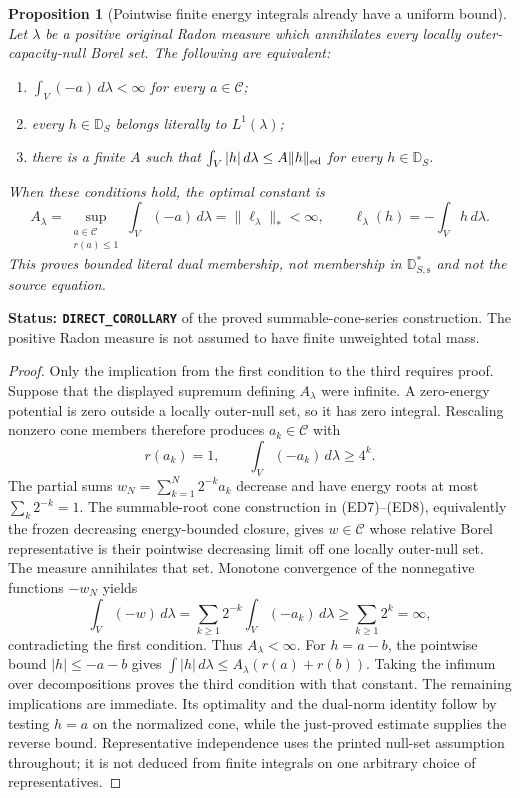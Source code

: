 \documentclass[11pt,a4paper]{article}
\numberwithin{equation}{section}
\newtheorem{proposition}[theorem]{Proposition}
\theoremstyle{definition}
\theoremstyle{remark}
\begin{document}
\begin{proposition}[Pointwise finite energy integrals already have a uniform bound]
\label{prop:r12-pointwise-finite-literal-dual}
Let $\lambda$ be a positive original Radon measure which
annihilates every locally outer-capacity-null Borel set. The
following are equivalent:
\begin{enumerate}
\item $\int_V(-a)\,d\lambda<\infty$ for every $a\in\mathscr C$;
\item every $h\in\mathbb D_S$ belongs literally to $L^1(\lambda)$;
\item there is a finite $A$ such that
$\int_V|h|\,d\lambda\leq A\|h\|_{\rm ed}$ for every
$h\in\mathbb D_S$.
\end{enumerate}
When these conditions hold, the optimal constant is
\[
 A_\lambda
   =\sup_{\substack{a\in\mathscr C\\r(a)\leq1}}
                  \int_V(-a)\,d\lambda
   =\|\ell_\lambda\|_*<\infty,
 \qquad \ell_\lambda(h)=-\int_Vh\,d\lambda.
 \tag{FD13}
\]
This proves bounded literal dual membership, not membership
in $\mathbb D_{S,\mathrm s}^*$ and not the source equation.
\end{proposition}

\noindent\textbf{Status: \texttt{DIRECT\_COROLLARY}} of the
proved summable-cone-series construction. The positive Radon
measure is not assumed to have finite unweighted total mass.

\begin{proof}
Only the implication from the first condition to the third
requires proof. Suppose that the displayed supremum defining
$A_\lambda$ were infinite. A zero-energy potential is zero
outside a locally outer-null set, so it has zero integral.
Rescaling nonzero cone members therefore produces $a_k\in
\mathscr C$ with
\[
                r(a_k)=1,\qquad
                \int_V(-a_k)\,d\lambda\geq4^k.
\]
The partial sums $w_N=\sum_{k=1}^N2^{-k}a_k$ decrease
and have energy roots at most $\sum_k2^{-k}=1$. The
summable-root cone construction in \textup{(ED7)--(ED8)},
equivalently the frozen decreasing energy-bounded closure,
gives $w\in\mathscr C$ whose relative Borel representative
is their pointwise decreasing limit off one locally outer-null
set. The measure annihilates that set. Monotone convergence
of the nonnegative functions $-w_N$ yields
\[
          \int_V(-w)\,d\lambda
              =\sum_{k\geq1}2^{-k}
                         \int_V(-a_k)\,d\lambda
              \geq\sum_{k\geq1}2^k=\infty,
\]
contradicting the first condition. Thus $A_\lambda<\infty$.
For $h=a-b$, the pointwise bound $|h|\leq-a-b$ gives
$\int|h|\,d\lambda\leq A_\lambda(r(a)+r(b))$.
Taking the infimum over decompositions proves the third
condition with that constant. The remaining implications
are immediate. Its optimality and the dual-norm identity
follow by testing $h=a$ on the normalized cone, while
the just-proved estimate supplies the reverse bound.
Representative independence uses the printed null-set
assumption throughout; it is not deduced from finite
integrals on one arbitrary choice of representatives.
\end{proof}
\end{document}
